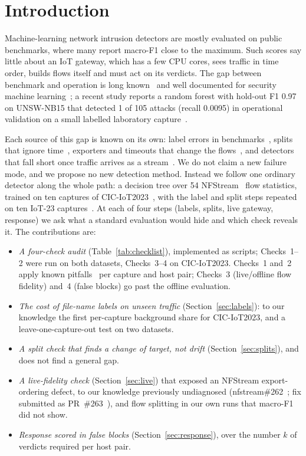 \section{Introduction}\label{sec:intro}

Machine-learning network intrusion detectors are mostly evaluated on public benchmarks, where many report macro-F1 close to the maximum. Such scores say little about an IoT gateway, which has a few CPU cores, sees traffic in time order, builds flows itself and must act on its verdicts. The gap between benchmark and operation is long known~\cite{sommer2010outside} and well documented for security machine learning~\cite{arp2022dos,apruzzese2023sok}; a recent study reports a random forest with hold-out F1 0.97 on UNSW-NB15 that detected 1 of 105 attacks (recall 0.0095) in operational validation on a small labelled laboratory capture~\cite{tang2026hybrid}.

Each source of this gap is known on its own: label errors in benchmarks~\cite{engelen2021troubleshooting,liu2022error,lanvin2023errors,flood2024smells}, splits that ignore time~\cite{pendlebury2019tesseract,arp2022dos,andresini2021insomnia}, exporters and timeouts that change the flows~\cite{velan2020impact,pinto2025flowexporter}, and detectors that fall short once traffic arrives as a stream~\cite{pekar2025early,zhao2026gidseval}. We do not claim a new failure mode, and we propose no new detection method. Instead we follow one ordinary detector along the whole path: a decision tree over 54 NFStream~\cite{aouini2022nfstream} flow statistics, trained on ten captures of CIC-IoT2023~\cite{neto2023ciciot2023}, with the label and split steps repeated on ten IoT-23 captures~\cite{garcia2020iot23}. At each of four steps (labels, splits, live gateway, response) we ask what a standard evaluation would hide and which check reveals it. The contributions are:
\begin{itemize}
\item \emph{A four-check audit} (Table~\ref{tab:checklist}), implemented as scripts; Checks~1--2 were run on both datasets, Checks~3--4 on CIC-IoT2023. Checks~1 and~2 apply known pitfalls~\cite{arp2022dos,flood2024smells} per capture and host pair; Checks~3 (live/offline flow fidelity) and~4 (false blocks) go past the offline evaluation.
\item \emph{The cost of file-name labels on unseen traffic} (Section~\ref{sec:labels}): to our knowledge the first per-capture background share for CIC-IoT2023, and a leave-one-capture-out test on two datasets.
\item \emph{A split check that finds a change of target, not drift} (Section~\ref{sec:splits}), and does not find a general gap.
\item \emph{A live-fidelity check} (Section~\ref{sec:live}) that exposed an NFStream export-ordering defect, to our knowledge previously undiagnosed (nfstream\#262~\cite{nfstream262}; fix submitted as PR~\#263~\cite{nfstream263}), and flow splitting in our own runs that macro-F1 did not show.
\item \emph{Response scored in false blocks} (Section~\ref{sec:response}), over the number $k$ of verdicts required per host pair.
\end{itemize}


